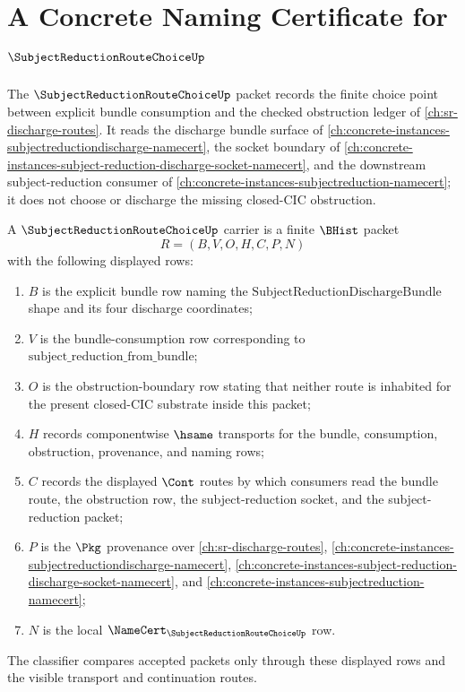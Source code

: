 \chapter{A Concrete Naming Certificate for $\SubjectReductionRouteChoiceUp$}
\label{ch:concrete-instances-subject-reduction-route-choice-namecert}

The $\SubjectReductionRouteChoiceUp$ packet records the finite choice point between explicit bundle consumption and the checked obstruction ledger of \autoref{ch:sr-discharge-routes}. It reads the discharge bundle surface of \autoref{ch:concrete-instances-subjectreductiondischarge-namecert}, the socket boundary of \autoref{ch:concrete-instances-subject-reduction-discharge-socket-namecert}, and the downstream subject-reduction consumer of \autoref{ch:concrete-instances-subjectreduction-namecert}; it does not choose or discharge the missing closed-CIC obstruction.

\begin{definition}
\label{def:subject-reduction-route-choice-carrier}
A $\SubjectReductionRouteChoiceUp$ carrier is a finite $\BHist$ packet
$$
R=(B,V,O,H,C,P,N)
$$
with the following displayed rows:
\begin{enumerate}
\item $B$ is the explicit bundle row naming the $\mathrm{SubjectReductionDischargeBundle}$ shape and its four discharge coordinates;
\item $V$ is the bundle-consumption row corresponding to $\mathrm{subject\_reduction\_from\_bundle}$;
\item $O$ is the obstruction-boundary row stating that neither route is inhabited for the present closed-CIC substrate inside this packet;
\item $H$ records componentwise $\hsame$ transports for the bundle, consumption, obstruction, provenance, and naming rows;
\item $C$ records the displayed $\Cont$ routes by which consumers read the bundle route, the obstruction row, the subject-reduction socket, and the subject-reduction packet;
\item $P$ is the $\Pkg$ provenance over \autoref{ch:sr-discharge-routes}, \autoref{ch:concrete-instances-subjectreductiondischarge-namecert}, \autoref{ch:concrete-instances-subject-reduction-discharge-socket-namecert}, and \autoref{ch:concrete-instances-subjectreduction-namecert};
\item $N$ is the local $\NameCert_{\SubjectReductionRouteChoiceUp}$ row.
\end{enumerate}
The classifier compares accepted packets only through these displayed rows and the visible transport and continuation routes.
\end{definition}

